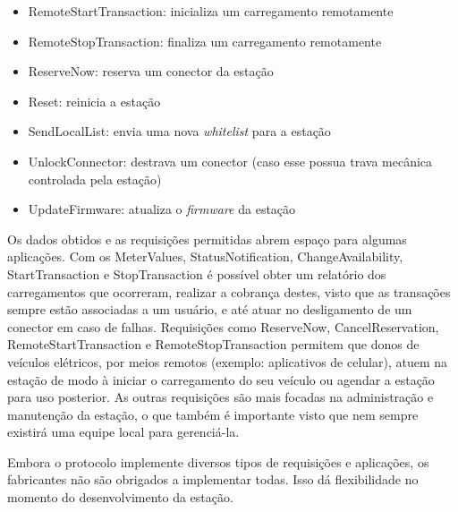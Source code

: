 \begin{itemize}
\begin{itemize}
        \item RemoteStartTransaction: inicializa um carregamento remotamente
        \item RemoteStopTransaction: finaliza um carregamento remotamente
        \item ReserveNow: reserva um conector da estação
        \item Reset: reinicia a estação
        \item SendLocalList: envia uma nova \textit{whitelist} para a estação
        \item UnlockConnector: destrava um conector (caso esse possua trava mecânica controlada pela estação)
        \item UpdateFirmware: atualiza o \textit{firmware} da estação
      \end{itemize}
    \end{itemize}

    Os dados obtidos e as requisições permitidas abrem espaço para algumas aplicações. Com os MeterValues, StatusNotification, ChangeAvailability, StartTransaction e StopTransaction é possível obter um relatório dos carregamentos que ocorreram, realizar a cobrança destes, visto que as transações sempre estão associadas a um usuário, e até atuar no desligamento de um conector em caso de falhas. Requisições como ReserveNow, CancelReservation, RemoteStartTransaction e RemoteStopTransaction permitem que donos de veículos elétricos, por meios remotos (exemplo: aplicativos de celular), atuem na estação de modo à iniciar o carregamento do seu veículo ou agendar a estação para uso posterior. As outras requisições são mais focadas na administração e manutenção da estação, o que também é importante visto que nem sempre existirá uma equipe local para gerenciá-la.

    Embora o protocolo implemente diversos tipos de requisições e aplicações, os fabricantes não são obrigados a implementar todas. Isso dá flexibilidade no momento do desenvolvimento da estação.